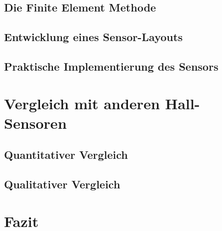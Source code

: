 \documentclass[12pt, a4paper]{article}
\begin{document}
	\subsection{Die Finite Element Methode}
	
	\subsection{Entwicklung eines Sensor-Layouts}
	
	\subsection{Praktische Implementierung des Sensors}
		
		
	\section{Vergleich mit anderen Hall-Sensoren}
	\subsection{Quantitativer Vergleich}
	
	\subsection{Qualitativer Vergleich}	
		
	\section{Fazit}
		
		
		
		
		
\end{document}

